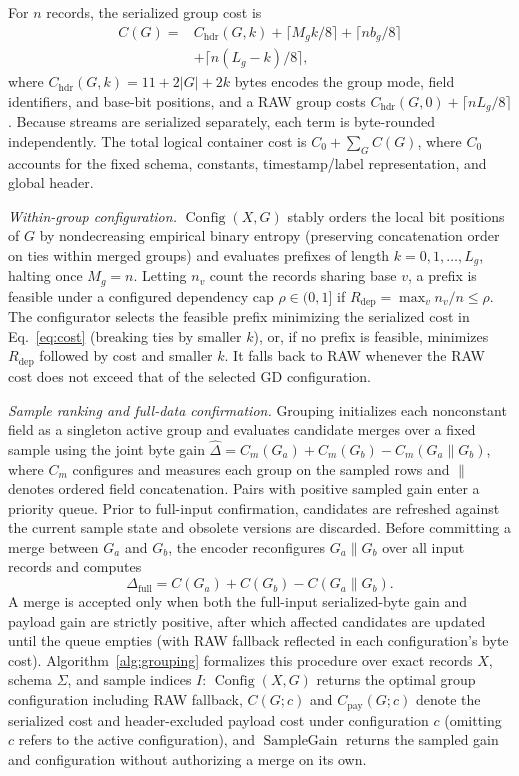 \documentclass[10pt,journal]{IEEEtran}
\begin{document}
For $n$ records, the serialized group cost is
\begin{equation}\label{eq:cost}
\begin{split}
C(G)={}&C_{\mathrm{hdr}}(G,k)+\lceil M_gk/8\rceil+\lceil nb_g/8\rceil\\
 &+\lceil n(L_g-k)/8\rceil,
\end{split}
\end{equation}
where $C_{\mathrm{hdr}}(G,k)=11+2|G|+2k$ bytes encodes the group mode, field identifiers, and base-bit positions, and a RAW group costs $C_{\mathrm{hdr}}(G,0)+\lceil nL_g/8\rceil$. Because streams are serialized separately, each term is byte-rounded independently. The total logical container cost is $C_0+\sum_G C(G)$, where $C_0$ accounts for the fixed schema, constants, timestamp/label representation, and global header.

\emph{Within-group configuration.}
$\operatorname{Config}(X,G)$ stably orders the local bit positions of $G$ by nondecreasing empirical binary entropy (preserving concatenation order on ties within merged groups) and evaluates prefixes of length $k=0,1,\ldots,L_g$, halting once $M_g=n$. Letting $n_v$ count the records sharing base $v$, a prefix is feasible under a configured dependency cap $\rho\in(0,1]$ if $R_{\mathrm{dep}}=\max_v n_v/n\leq\rho$. The configurator selects the feasible prefix minimizing the serialized cost in Eq.~\eqref{eq:cost} (breaking ties by smaller $k$), or, if no prefix is feasible, minimizes $R_{\mathrm{dep}}$ followed by cost and smaller $k$. It falls back to RAW whenever the RAW cost does not exceed that of the selected GD configuration.

\emph{Sample ranking and full-data confirmation.}
Grouping initializes each nonconstant field as a singleton active group and evaluates candidate merges over a fixed sample using the joint byte gain $\widehat\Delta=C_m(G_a)+C_m(G_b)-C_m(G_a\mathbin{\|}G_b)$, where $C_m$ configures and measures each group on the sampled rows and $\|$ denotes ordered field concatenation. Pairs with positive sampled gain enter a priority queue. Prior to full-input confirmation, candidates are refreshed against the current sample state and obsolete versions are discarded. Before committing a merge between $G_a$ and $G_b$, the encoder reconfigures $G_a\mathbin{\|}G_b$ over all input records and computes
\begin{equation}
\Delta_{\mathrm{full}}=C(G_a)+C(G_b)-C(G_a\mathbin{\|}G_b).
\end{equation}
A merge is accepted only when both the full-input serialized-byte gain and payload gain are strictly positive, after which affected candidates are updated until the queue empties (with RAW fallback reflected in each configuration's byte cost). Algorithm~\ref{alg:grouping} formalizes this procedure over exact records $X$, schema $\Sigma$, and sample indices $I$: $\operatorname{Config}(X,G)$ returns the optimal group configuration including RAW fallback, $C(G;c)$ and $C_{\mathrm{pay}}(G;c)$ denote the serialized cost and header-excluded payload cost under configuration $c$ (omitting $c$ refers to the active configuration), and $\operatorname{SampleGain}$ returns the sampled gain and configuration without authorizing a merge on its own.
\end{document}
